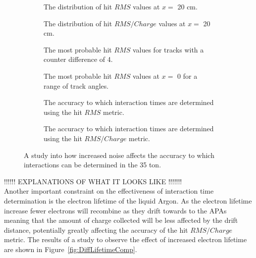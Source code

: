 \begin{figure}[h!]
  \centering
  \begin{subfigure}{0.45\textwidth}
    \centering
    \caption{The distribution of hit $RMS$ values at $x =$ 20 cm.}
    \label{fig:DiffNoiseComp1}
  \end{subfigure}
  \hspace{0.08\textwidth}
  \begin{subfigure}{0.45\textwidth}
    \centering
    \caption{The distribution of hit $RMS/Charge$ values at $x =$ 20 cm.}
    \label{fig:DiffNoiseComp2}
  \end{subfigure}
  \begin{subfigure}{0.45\textwidth}
    \centering
    \caption{The most probable hit $RMS$ values for tracks with a counter difference of 4.}
    \label{fig:DiffNoiseComp3}
  \end{subfigure}
  \hspace{0.08\textwidth}
  \begin{subfigure}{0.45\textwidth}
    \centering
    \caption{The most probable hit $RMS$ values at $x = $ 0 for a range of track angles.}
    \label{fig:DiffNoiseComp4}
  \end{subfigure}
  \begin{subfigure}{0.45\textwidth}
    \centering
    \caption{The accuracy to which interaction times are determined using the hit $RMS$ metric.}
    \label{fig:DiffNoiseComp5}
  \end{subfigure}
  \hspace{0.08\textwidth}
  \begin{subfigure}{0.45\textwidth}
    \centering
    \caption{The accuracy to which interaction times are determined using the hit $RMS/Charge$ metric.}
    \label{fig:DiffNoiseComp6}
  \end{subfigure}
  \caption[The effect that an increased noise level has on the accuracy of interaction time determination]
          {A study into how increased noise affects the accuracy to which interactions can be determined in the 35 ton.}
          \label{fig:DiffNoiseComp}
\end{figure}

!!!!!! EXPLANATIONS OF WHAT IT LOOKS LIKE !!!!!!! \\

Another important constraint on the effectiveness of interaction time determination is the electron lifetime of the liquid Argon. As the electron lifetime increase fewer electrons will recombine as they drift towards to the APAs meaning that the amount of charge collected will be less affected by the drift distance, potentially greatly affecting the accuracy of the hit $RMS/Charge$ metric. The results of a study to observe the effect of increased electron lifetime are shown in Figure~\ref{fig:DiffLifetimeComp}. \\

